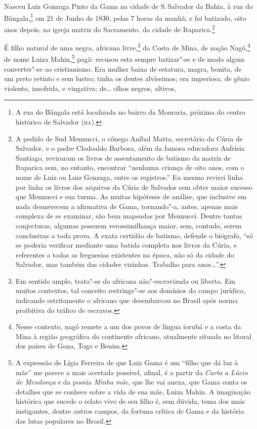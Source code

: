 Nasceu Luiz Gonzaga Pinto da Gama na cidade de S.\,Salvador da Bahia, à
rua do Bângala,\footnote{A rua do Bângala está localizada no bairro da
  Mouraria, próxima do centro histórico de Salvador (\textsc{ba}).} em 21 de
Junho de 1830, pelas 7 horas da manhã; e foi batizado, oito anos depois,
na igreja matriz do Sacramento, da cidade de Itaparica.\footnote{A
  pedido de Sud Mennucci, o cônego Aníbal Matta, secretário da Cúria de
  Salvador, e o padre Clodoaldo Barbosa, além da famosa educadora
  Anfrísia Santiago, reviraram os livros de assentamento de batismo da
  matriz de Itaparica sem, no entanto, encontrar ``nenhuma criança de
  oito anos, com o nome de Luiz ou Luiz Gonzaga, entre os registros.'' Eu
  mesmo revirei linha por linha os livros dos arquivos da Cúria de
  Salvador sem obter maior sucesso que Mennucci e sua turma. As muitas
  hipóteses de análise, que inclusive em nada desmerecem a afirmativa de
  Gama, tornando"-a, antes, apenas mais complexa de se examinar, são bem
  mapeadas por Mennucci. Dentre tantas conjecturas, algumas possuem
  verossimilhança maior, sem, contudo, serem conclusivas a toda prova. A
  exata certidão de batismo, defende o biógrafo, ``só se poderia
  verificar mediante uma batida completa nos livros da Cúria, e
  referentes a todas as freguesias existentes na época, não só da cidade
  do Salvador, mas também das cidades vizinhas. Trabalho para anos\ldots{}''.}

É filho natural de uma negra, africana livre,\footnote{Em sentido
  amplo, trata"-se da africana não"-escravizada ou liberta. Em muitos
  contextos, tal conceito restringe"-se aos domínios do campo jurídico,
  indicando estritamente o africano que desembarcou no Brasil após norma
  proibitiva do tráfico de escravos.} da Costa de Mina, de nação
Nagô,\footnote{Nesse contexto, nagô remete a um dos povos de língua
  iorubá e a costa da Mina à região geográfica do continente africano,
  atualmente situada no litoral dos países de Gana, Togo e Benim.} de
nome Luiza Mahin,\footnote{A expressão de Lígia Ferreira de que Luiz
  Gama é um ``filho que dá luz à mãe'' me parece a mais acertada possível,
  afinal, é a partir da \emph{Carta a Lúcio de Mendonça} e da poesia
  \emph{Minha mãe}, que lhe vai anexa, que Gama conta os detalhes que
  se conhece sobre a vida de sua mãe, Luiza Mahin. A imaginação histórica
  que sucede o relato vivo de seu filho é, sem dúvida, tema dos mais
  instigantes, dentre outros campos, da fortuna crítica de Gama e da
  história das lutas populares no Brasil.} pagã: recusou esta sempre
batizar"-se e de modo algum converter"-se ao cristianismo. Era mulher
baixa de estatura, magra, bonita, de um preto retinto e sem lustro;
tinha os dentes alvíssimos; era imperiosa, de gênio violento, insofrida,
e vingativa; de\ldots{} olhos negros, altivos,

